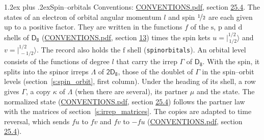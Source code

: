 \documentclass[10pt,a4paper]{article}
\makeatletter
\renewcommand\section{\@startsection{section}{1}{\z@}{-3ex plus -1ex minus -.2ex}%
  {1.2ex plus .2ex}{\normalfont\large\sffamily\bfseries\color{parttitle}}}
\numberwithin{equation}{section}
\newcommand{\grp}[1]{\mathsf{#1}}
\newcommand{\orbital}[1]{\mathrm{#1}}
\newcommand{\mult}{\kappa}
\newcommand{\intx}{\mu}
\newcommand{\jm}[2]{\bigl\lvert{}^{#1}_{\,#2}\bigr\rangle}
\makeatother
\begin{document}
\section{Spin--orbitals}\label{s:spin_orbitals}
Conventions: \href{../../CONVENTIONS.pdf}{CONVENTIONS.pdf}, section \href{../../CONVENTIONS.pdf\#conv.25.4}{25.4}.
\leavevmode\label{n:index.orbital.l}The states of an electron of orbital angular momentum $l$ and spin $\nicefrac{1}{2}$ are each given up to a positive factor. \label{n:local.spinor.uv}\label{n:local.function.f}They are written in the functions $f$ of the $\orbital{s}$, $\orbital{p}$ and $\orbital{d}$ shells of \href{../../../rotation/data/pdf/D8.pdf}{$\grp{D_{8}}$} (\href{../../CONVENTIONS.pdf}{CONVENTIONS.pdf}, section \href{../../../rotation/CONVENTIONS.pdf\#conv.13}{13}) times the spin kets $u = \jm{1/2}{1/2}$ and $v = \jm{1/2}{-1/2}$. The record also holds the $\orbital{f}$ shell (\texttt{spinorbitals}). An orbital level consists of the functions of degree $l$ that carry the irrep $\Gamma$ of \href{../../../rotation/data/pdf/D8.pdf}{$\grp{D_{8}}$}. With the spin, it splits into the spinor irreps $\Lambda$ of $\grp{2D_{8}}$, those of the doublet of $\Gamma$ in the spin--orbit levels (section~\ref{s:spin_orbit}, first column). \label{n:head.state}Under the heading of its shell, a row gives $\Gamma$, a copy $\mult$ of $\Lambda$ (when there are several), its partner $\intx$ and the state. The normalized state (\href{../../CONVENTIONS.pdf}{CONVENTIONS.pdf}, section \href{../../CONVENTIONS.pdf\#conv.25.4}{25.4}) follows the partner law with the matrices of section~\ref{s:irrep_matrices}. The copies are adapted to time reversal, which sends $f u$ to $f v$ and $f v$ to $-f u$ (\href{../../CONVENTIONS.pdf}{CONVENTIONS.pdf}, section \href{../../CONVENTIONS.pdf\#conv.25.4}{25.4}).
\end{document}
